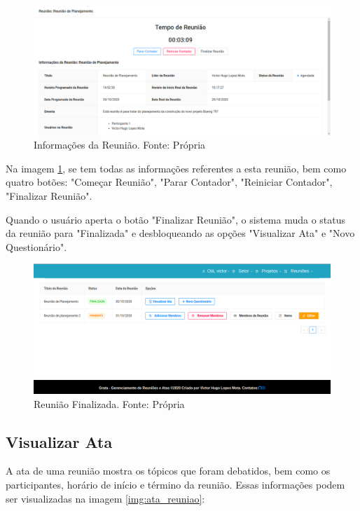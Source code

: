\begin{figure}[H]
    \centering
    \includegraphics[width=1.0\textwidth]{figuras/informacoes_reuniao.png}
    \caption{Informações da Reunião. Fonte: Própria}
    \label{img:informacoes_reuniao}
\end{figure}

Na imagem \ref{img:informacoes_reuniao}, se tem todas as informações referentes a esta reunião, bem como quatro botões: "Começar Reunião", "Parar Contador", "Reiniciar Contador", "Finalizar Reunião".

Quando o usuário aperta o botão "Finalizar Reunião", o sistema muda o status da reunião para "Finalizada" e desbloqueando as opções "Visualizar Ata" e "Novo Questionário". 

\begin{figure}[H]
    \centering
    \includegraphics[width=1.0\textwidth]{figuras/reuniao_finalizada.png}
    \caption{Reunião Finalizada. Fonte: Própria}
    \label{img:reuniao_finalizada}
\end{figure}

\subsection{Visualizar Ata}

A ata de uma reunião mostra os tópicos que foram debatidos, bem como os participantes, horário de início e término da reunião. Essas informações podem ser visualizadas na imagem \ref{img:ata_reuniao}:

